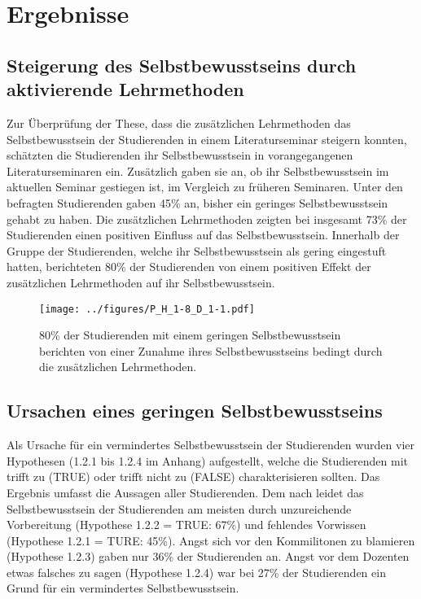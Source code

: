 \section{Ergebnisse}

\subsection{Steigerung des Selbstbewusstseins durch aktivierende Lehrmethoden}
Zur Überprüfung der These, dass die zusätzlichen Lehrmethoden das Selbstbewusstsein der Studierenden in einem Literaturseminar steigern konnten, schätzten die Studierenden ihr Selbstbewusstsein in vorangegangenen Literaturseminaren ein. Zusätzlich gaben sie an, ob ihr Selbstbewusstsein im aktuellen Seminar gestiegen ist, im Vergleich zu früheren Seminaren. Unter den befragten Studierenden gaben 45\% an, bisher ein geringes Selbstbewusstsein gehabt zu haben. Die zusätzlichen Lehrmethoden zeigten bei insgesamt 73\% der Studierenden einen positiven Einfluss auf das Selbstbewusstsein. Innerhalb der Gruppe der Studierenden, welche ihr Selbstbewusstsein als gering eingestuft hatten, berichteten 80\% der Studierenden von einem positiven Effekt der zusätzlichen Lehrmethoden auf ihr Selbstbewusstsein.

\begin{figure}[h!]
\begin{center}
	\texttt{[image: ../figures/P\_H\_1-8\_D\_1-1.pdf]}
\end{center}
	\caption{ 80\% der Studierenden mit einem geringen Selbstbewusstsein berichten von einer Zunahme ihres Selbstbewusstseins bedingt durch die zusätzlichen Lehrmethoden.}
\end{figure}

\subsection{Ursachen eines geringen Selbstbewusstseins}
Als Ursache für ein vermindertes Selbstbewusstsein der Studierenden wurden vier Hypothesen (1.2.1 bis 1.2.4 im Anhang) aufgestellt, welche die Studierenden mit trifft zu (TRUE) oder trifft nicht zu (FALSE) charakterisieren sollten. Das Ergebnis umfasst die Aussagen aller Studierenden. Dem nach leidet das Selbstbewusstsein der Studierenden am meisten durch unzureichende Vorbereitung (Hypothese 1.2.2 = TRUE: 67\%) und fehlendes Vorwissen (Hypothese 1.2.1 = TURE: 45\%). Angst sich vor den Kommilitonen zu blamieren (Hypothese 1.2.3) gaben nur 36\% der Studierenden an. Angst vor dem Dozenten etwas falsches zu sagen (Hypothese 1.2.4) war bei 27\% der Studierenden ein Grund für ein vermindertes Selbstbewusstsein.   

